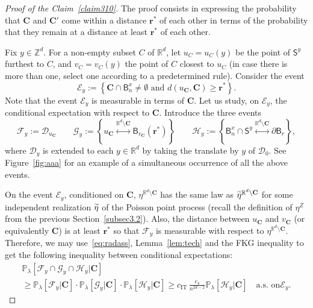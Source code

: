 \documentclass[AHL,Unicode,longabstracts]{cedram}
\newcommand{\rbf}{\mathbf{r}}
\newcommand{\Cbf}{\mathbf{C}}
\DeclareMathOperator{\IT}{IT}
\let\oldtilde\tilde
\renewcommand*{\tilde}[1]{\mathchoice{\widetilde{#1}}{\widetilde{#1}}{\oldtilde{#1}}{\oldtilde{#1}}}
\begin{document}
\begin{proof}[Proof of the Claim~\ref{claim310}]
The proof consists in expressing the probability that ${\Cbf}$ and ${\Cbf'}$ come within a distance ${\rbf^*}$ of each other in terms of the probability that they remain at a distance at least ${\rbf^*}$ of each other.

Fix $y\in{\mathbb Z}^d$. For a non-empty subset $C$ of ${\mathbb R}^d$, let $u_C=u_C(y)$ be the point of $\mathsf S^y$ furthest to $C$, and $v_C=v_C(y)$ the point of $C$ closest to $u_C$ (in case there is more than one, select one according to a predetermined rule). Consider the event
\[
{\mathcal E}_y:=\left\{{\Cbf}\cap\mathsf B^x_{n}\ne\emptyset\text{ and }d(u_{\Cbf},{\Cbf})\ge{\rbf^*}\right\}.
\]
Note that the event ${\mathcal E}_y$ is measurable in terms of ${\Cbf}$. Let us study, on ${\mathcal E}_y$, the conditional expectation with respect to ${\Cbf}$. Introduce the three events
\[
{\mathcal F}_y:={\mathcal D}_{u_{\Cbf}}
\qquad{\mathcal G}_y:=\left\{u_{\Cbf}\stackrel{{\mathbb R}^d\setminus{\Cbf}}{\longleftrightarrow}\mathsf B_{v_{\Cbf}}({\rbf^*})\right\}
\qquad{\mathcal H}_y:=\left\{\mathsf B^x_{n}\cap\mathsf S^y\stackrel{{\mathbb R}^d\setminus{\Cbf}}{\longleftrightarrow}\partial\mathsf B_r\right\},
\]
where ${\mathcal D}_y$ is extended to each $y\in{\mathbb R}^d$ by taking the translate by $y$ of ${\mathcal D}_0$. See Figure~\ref{fig:aaa} for an example of a simultaneous occurrence of all the above events.

On the event ${\mathcal E}_y$, conditioned on ${\Cbf}$, $\eta^{{\mathbb R}^d\setminus{\Cbf}}$ has the same law as $\tilde\eta^{{\mathbb R}^d\setminus {\Cbf}}$ for some independent realization $\tilde\eta$ of the Poisson point process (recall the definition of $\eta^Z$ from the previous Section~\ref{subsec3.2}). Also, the distance between $u_{\Cbf}$ and $v_{\Cbf}$ (or equivalently ${\Cbf}$) is at least ${\rbf^*}$ so that ${\mathcal F}_y$ is measurable with respect to $\eta^{{\mathbb R}^d\setminus{\Cbf}}$. Therefore, we may use~\eqref{eq:radass}, Lemma~\ref{lem:tech} and the FKG inequality to get the following inequality between conditional expectations:
\begin{multline}\label{eq:r}
{\mathbb P}_\lambda[{\mathcal F}_y\cap{\mathcal G}_y\cap{\mathcal H}_y|{\Cbf}] \\
\ge {\mathbb P}_\lambda[{\mathcal F}_y|{\Cbf}]\cdot {\mathbb P}_\lambda[{\mathcal G}_y|{\Cbf}]\cdot {\mathbb P}_\lambda[{\mathcal H}_y|{\Cbf}]\ge {c_{\IT}}\,\frac{c_4}{n^{2d-2}}{\mathbb P}_\lambda[{\mathcal H}_y|{\Cbf}]\quad\text{a.s. on}\mathcal E_y.
\end{multline}


\end{proof}
\end{document}
